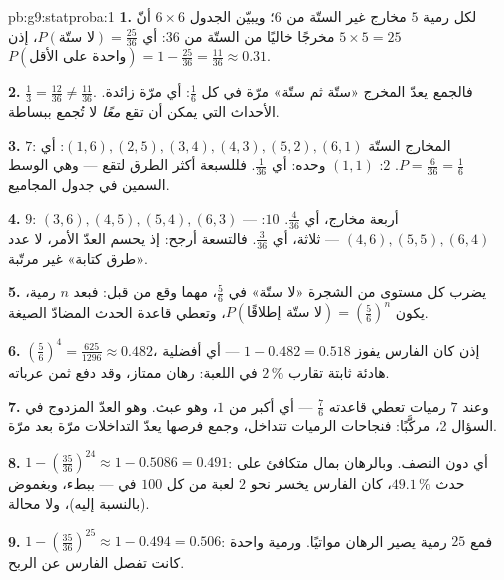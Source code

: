 \begin{solution}{pb:g9:statproba:1}
\textbf{1.} لكل رمية $5$ مخارج غير الستّة من $6$؛ ويبيّن الجدول
$6 \times 6$ أنّ $5 \times 5 = 25$ مخرجًا خاليًا من الستّة من
$36$: أي $P(\text{لا ستّة}) = \frac{25}{36}$، إذن
$P(\text{واحدة على الأقل}) = 1 - \frac{25}{36} = \frac{11}{36}
\approx 0.31$.

\textbf{2.} $\frac13 = \frac{12}{36} \neq \frac{11}{36}$. فالجمع
يعدّ المخرج «ستّة ثم ستّة» مرّة في كل $\frac16$: أي مرّة زائدة.
 الأحداث التي يمكن أن تقع \emph{معًا} لا تُجمع
ببساطة.

\textbf{3.}  $7$: المخارج الستّة $(1,6), (2,5), (3,4),
(4,3), (5,2), (6,1)$: أي $P = \frac{6}{36} = \frac16$.  $2$:
$(1,1)$ وحده: أي $\frac{1}{36}$. فللسبعة أكثر الطرق لتقع ---
وهي الوسط السمين في جدول المجاميع.

\textbf{4.}  $9$: $(3,6), (4,5), (5,4), (6,3)$ --- أربعة
مخارج، أي $\frac{4}{36}$.  $10$: $(4,6), (5,5), (6,4)$ ---
ثلاثة، أي $\frac{3}{36}$. فالتسعة أرجح: إذ يحسم العدّ الأمر، لا
عدد «طرق كتابة»   غير مرتّبة.

\textbf{5.} يضرب كل مستوى من الشجرة  «لا ستّة» في
$\frac56$، مهما وقع من قبل: فبعد $n$ رمية، يكون
$P(\text{لا ستّة إطلاقًا}) = \left(\frac56\right)^n$، وتعطي
قاعدة الحدث المضادّ الصيغة.

\textbf{6.} $\left(\frac56\right)^4 = \frac{625}{1296} \approx
0.482$، إذن كان الفارس يفوز 
$1 - 0.482 = 0.518$ --- أي أفضلية هادئة ثابتة تقارب
$2\,\%$ في اللعبة: رهان ممتاز، وقد دفع ثمن عرباته.

\textbf{7.} وعند $7$ رميات تعطي قاعدته $\frac76$ --- أي
 أكبر من $1$، وهو عبث. وهو العدّ المزدوج في السؤال 2،
مركَّبًا: فنجاحات الرميات تتداخل، وجمع فرصها يعدّ التداخلات
مرّة بعد مرّة.

\textbf{8.} $1 - \left(\frac{35}{36}\right)^{24} \approx
1 - 0.5086 = 0.491$: أي دون النصف. وبالرهان بمال متكافئ على
حدث  $49.1\,\%$، كان الفارس يخسر نحو $2$ لعبة من كل
$100$ في  --- ببطء، وبغموض (بالنسبة إليه)، ولا محالة.

\textbf{9.} $1 - \left(\frac{35}{36}\right)^{25} \approx
1 - 0.494 = 0.506$: فمع $25$ رمية يصير الرهان مواتيًا. ورمية
واحدة كانت تفصل الفارس عن الربح.


\end{solution}
